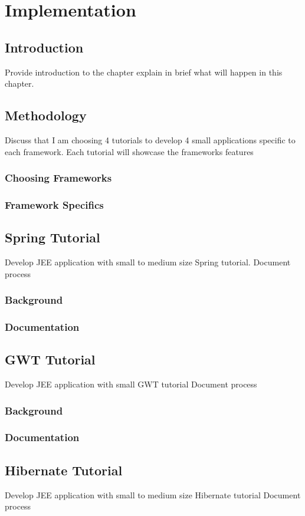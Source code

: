 \chapter*{Implementation}
\section{Introduction}
Provide introduction to the chapter explain in brief what will happen in this chapter.
\section{Methodology}
Discuss that I am choosing 4 tutorials to develop 4 small applications specific to each 
framework. Each tutorial will showcase the frameworks features
\subsection{Choosing Frameworks}
\subsection{Framework Specifics}

\section{Spring Tutorial}
Develop JEE application with small to medium size Spring tutorial.
Document process 
\subsection{Background}
\subsection{Documentation}

\section{GWT Tutorial}
Develop JEE application with small GWT tutorial
Document process
\subsection{Background}
\subsection{Documentation}

\section{Hibernate Tutorial}
Develop JEE application with small to medium size Hibernate tutorial
Document process 
